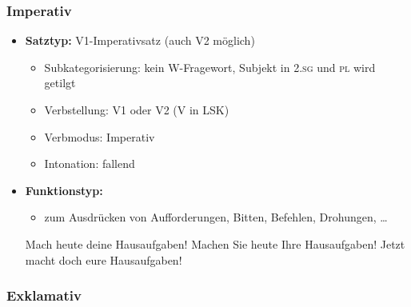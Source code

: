\begin{frame}
\frametitle{Imperativ}

\begin{itemize}
	\item \textbf{Satztyp:} V1-Imperativsatz (auch V2 möglich)
	\begin{itemize}
		\item Subkategorisierung: kein W-Fragewort, Subjekt in \textsc{2.sg} und \textsc{pl} wird getilgt
		\item Verbstellung: V1 oder V2 (V in LSK)
		\item Verbmodus: Imperativ
		\item Intonation: fallend
	\end{itemize}
	\item \textbf{Funktionstyp:}
	\begin{itemize}
		\item zum Ausdrücken von Aufforderungen, Bitten, Befehlen, Drohungen, \dots
	\end{itemize}
	
	\eal
	\ex Mach heute deine Hausaufgaben!
	\ex Machen Sie heute Ihre Hausaufgaben!
	\ex Jetzt macht doch eure Hausaufgaben!
	\zl
	
\end{itemize}

\end{frame}


\subsubsection{Exklamativ}



